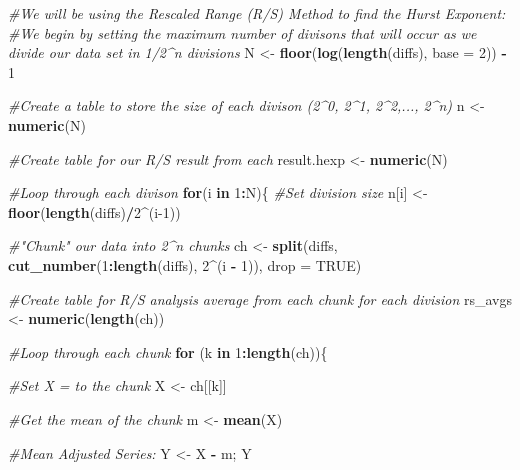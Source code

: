 \documentclass[]{article}
\newenvironment{Shaded}{\begin{snugshade}}{\end{snugshade}}
\newcommand{\CommentTok}[1]{\textcolor[rgb]{0.56,0.35,0.01}{\textit{#1}}}
\newcommand{\ControlFlowTok}[1]{\textcolor[rgb]{0.13,0.29,0.53}{\textbf{#1}}}
\newcommand{\DataTypeTok}[1]{\textcolor[rgb]{0.13,0.29,0.53}{#1}}
\newcommand{\DecValTok}[1]{\textcolor[rgb]{0.00,0.00,0.81}{#1}}
\newcommand{\KeywordTok}[1]{\textcolor[rgb]{0.13,0.29,0.53}{\textbf{#1}}}
\newcommand{\NormalTok}[1]{#1}
\newcommand{\OperatorTok}[1]{\textcolor[rgb]{0.81,0.36,0.00}{\textbf{#1}}}
\newcommand{\OtherTok}[1]{\textcolor[rgb]{0.56,0.35,0.01}{#1}}
\newcommand{\StringTok}[1]{\textcolor[rgb]{0.31,0.60,0.02}{#1}}
\begin{document}
\begin{Shaded}
\begin{Highlighting}[]
\CommentTok{#We will be using the Rescaled Range (R/S) Method to find the Hurst Exponent:}
\CommentTok{#We begin by setting the maximum number of divisons that will occur as we divide our data set in 1/2^n divisions}
\NormalTok{N <-}\StringTok{ }\KeywordTok{floor}\NormalTok{(}\KeywordTok{log}\NormalTok{(}\KeywordTok{length}\NormalTok{(diffs), }\DataTypeTok{base =} \DecValTok{2}\NormalTok{)) }\OperatorTok{-}\StringTok{ }\DecValTok{1}

\CommentTok{#Create a table to store the size of each divison (2^0, 2^1, 2^2,..., 2^n)}
\NormalTok{n <-}\StringTok{ }\KeywordTok{numeric}\NormalTok{(N)}

\CommentTok{#Create table for our R/S result from each }
\NormalTok{result.hexp <-}\StringTok{ }\KeywordTok{numeric}\NormalTok{(N)}

\CommentTok{#Loop through each divison}
\ControlFlowTok{for}\NormalTok{(i }\ControlFlowTok{in} \DecValTok{1}\OperatorTok{:}\NormalTok{N)\{}
  \CommentTok{#Set division size}
\NormalTok{  n[i] <-}\StringTok{ }\KeywordTok{floor}\NormalTok{(}\KeywordTok{length}\NormalTok{(diffs)}\OperatorTok{/}\DecValTok{2}\OperatorTok{^}\NormalTok{(i}\DecValTok{-1}\NormalTok{))}
  
  \CommentTok{#"Chunk" our data into 2^n chunks}
\NormalTok{  ch <-}\StringTok{ }\KeywordTok{split}\NormalTok{(diffs, }\KeywordTok{cut_number}\NormalTok{(}\DecValTok{1}\OperatorTok{:}\KeywordTok{length}\NormalTok{(diffs), }\DecValTok{2}\OperatorTok{^}\NormalTok{(i }\OperatorTok{-}\StringTok{ }\DecValTok{1}\NormalTok{)), }\DataTypeTok{drop =} \OtherTok{TRUE}\NormalTok{)}
  
  \CommentTok{#Create table for R/S analysis average from each chunk for each division}
\NormalTok{  rs_avgs <-}\StringTok{ }\KeywordTok{numeric}\NormalTok{(}\KeywordTok{length}\NormalTok{(ch))}
  
  \CommentTok{#Loop through each chunk}
  \ControlFlowTok{for}\NormalTok{ (k }\ControlFlowTok{in} \DecValTok{1}\OperatorTok{:}\KeywordTok{length}\NormalTok{(ch))\{}
    
    \CommentTok{#Set X = to the chunk}
\NormalTok{    X <-}\StringTok{ }\NormalTok{ch[[k]]}
    
    \CommentTok{#Get the mean of the chunk}
\NormalTok{    m <-}\StringTok{ }\KeywordTok{mean}\NormalTok{(X)}
    
    \CommentTok{#Mean Adjusted Series:}
\NormalTok{    Y <-}\StringTok{ }\NormalTok{X }\OperatorTok{-}\StringTok{ }\NormalTok{m; Y}
    

\end{Highlighting}
\end{Shaded}
\end{document}
